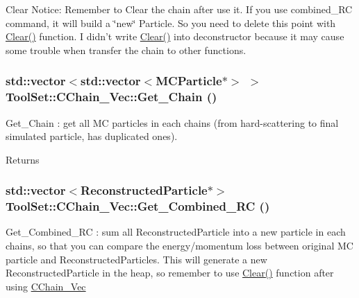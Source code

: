 Clear Notice: Remember to Clear the chain after use it. If you use combined\_\-RC command, it will build a \char`\"{}new\char`\"{} Particle. So you need to delete this point with \hyperlink{classToolSet_1_1CChain__Vec_a3068461a3bd0fe085f522e6bb2d24f07}{Clear()} function. I didn't write \hyperlink{classToolSet_1_1CChain__Vec_a3068461a3bd0fe085f522e6bb2d24f07}{Clear()} into deconstructor because it may cause some trouble when transfer the chain to other functions. \hypertarget{classToolSet_1_1CChain__Vec_a1192336ddae3a84cdaa2915b28955ccf}{
\subsubsection[{Get\_\-Chain}]{\setlength{\rightskip}{0pt plus 5cm}std::vector$<$std::vector$<$MCParticle$\ast$$>$ $>$ ToolSet::CChain\_\-Vec::Get\_\-Chain ()}}
\label{classToolSet_1_1CChain__Vec_a1192336ddae3a84cdaa2915b28955ccf}


Get\_\-Chain : get all MC particles in each chains (from hard-\/scattering to final simulated particle, has duplicated ones). \begin{DoxyReturn}{Returns}

\end{DoxyReturn}
\hypertarget{classToolSet_1_1CChain__Vec_a9a4356193e3c851e7fa16c3a8158e959}{
\subsubsection[{Get\_\-Combined\_\-RC}]{\setlength{\rightskip}{0pt plus 5cm}std::vector$<$ReconstructedParticle$\ast$$>$ ToolSet::CChain\_\-Vec::Get\_\-Combined\_\-RC ()}}
\label{classToolSet_1_1CChain__Vec_a9a4356193e3c851e7fa16c3a8158e959}


Get\_\-Combined\_\-RC : sum all ReconstructedParticle into a new particle in each chains, so that you can compare the energy/momentum loss between original MC particle and ReconstructedParticles. This will generate a new ReconstructedParticle in the heap, so remember to use \hyperlink{classToolSet_1_1CChain__Vec_a3068461a3bd0fe085f522e6bb2d24f07}{Clear()} function after using \hyperlink{classToolSet_1_1CChain__Vec}{CChain\_\-Vec}

